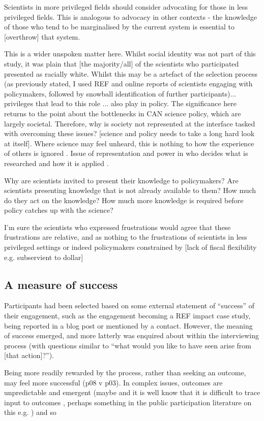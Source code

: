 Scientists in more privileged fields should consider advocating for those in less privileged fields. This is analogous to advocacy in other contexts - the knowledge of those who tend to be marginalised by the current system is essential to [overthrow] that system.

This is a wider unspoken matter here. Whilst social identity was not part of this study, it was plain that [the majority/all] of the scientists who participated presented as racially white. Whilst this may be a artefact of the selection process (as previously stated, I used REF and online reports of scientists engaging with policymakers, followed by snowball identification of further participants)... privileges that lead to this role ... also play in policy. The significance here returns to the point about the bottlenecks in CAN science policy, which are largely societal. Therefore, why is society not represented at the interface tasked with overcoming these issues? [science and policy needs to take a long hard look at itself]. Where science may feel unheard, this is nothing to how the experience of others is ignored \cite{IbarraJOBCIMRS2022}. Issue of representation and power in who decides what is researched and how it is applied \cite{McNiePS2017}.

Why are scientists invited to present their knowledge to policymakers? Are scientists presenting knowledge that is not already available to them? How much do they act on the knowledge? How much more knowledge is required before policy catches up with the science?

I'm sure the scientists who expressed frustrations would agree that these frustrations are relative, and as nothing to the frustrations of scientists in less privileged settings or indeed policymakers constrained by [lack of fiscal flexibility e.g. subservient to dollar]

\subsection{A measure of success}
Participants had been selected based on some external statement of ``success'' of their engagement, such as the engagement becoming a REF impact case study, being reported in a blog post or mentioned by a contact. However, the meaning of success emerged, and more latterly was enquired about within the interviewing process (with questions similar to ``what would you like to have seen arise from [that action]?'').

Being more readily rewarded by the process, rather than seeking an outcome, may feel more successful (p08 v p03). In complex issues, outcomes are unpredictable and emergent (maybe \cite{SnowdenB2007} and it is well know that it is difficult to trace input to outcomes \cite{BednarekSHG2015}, perhaps something in the public participation literature on this e.g. \cite{Sprain2016}) and so 

